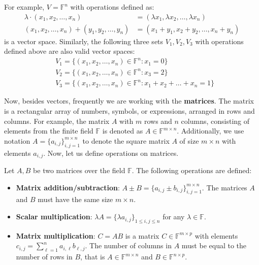 \documentclass[../lecture-notes.tex]{subfiles}
\begin{document}
\begin{example}
    For example, $V = \mathbb{F}^n$ with operations defined as:
    \begin{equation*}
        \begin{aligned}
            \lambda \cdot (x_1,x_2,\dots,x_n) &= (\lambda x_1, \lambda x_2, \dots, \lambda x_n) \\
            (x_1,x_2,\dots,x_n) + (y_1,y_2,\dots,y_n) &= (x_1+y_1, x_2+y_2, \dots, x_n+y_n)
        \end{aligned}
    \end{equation*}
    is a vector space. Similarly, the following three sets $V_1,V_2,V_3$ with operations defined above are also valid vector spaces:
    \begin{equation*}
        \begin{aligned}
            &V_1 = \{(x_1,x_2,\dots,x_n) \in \mathbb{F}^n: x_1 = 0\} \\
            &V_2 = \{(x_1,x_2,\dots,x_n) \in \mathbb{F}^n: x_3 = 2\} \\
            &V_3 = \{(x_1,x_2,\dots,x_n) \in \mathbb{F}^n: x_1+x_2+\dots+x_n = 1\}
        \end{aligned}
    \end{equation*}
\end{example}

Now, besides vectors, frequently we are working with the \textbf{matrices}. The matrix is a rectangular array of numbers, symbols, or expressions, arranged in rows and columns. For example, the matrix $A$ with $m$ rows and $n$ columns, consisting of elements from the finite field $\mathbb{F}$ is denoted as $A \in \mathbb{F}^{m \times n}$. Additionally, we use notation $A = \{a_{i,j}\}_{i,j=1}^{m \times n}$ to denote the square matrix $A$ of size $m \times n$ with elements $a_{i,j}$. Now, let us define operations on matrices.

\begin{definition}
    Let $A,B$ be two matrices over the field $\mathbb{F}$. The following operations are defined:
    \begin{itemize}
        \item \textbf{Matrix addition/subtraction}: $A \pm B = \{a_{i,j} \pm b_{i,j}\}_{i,j=1}^{m \times n}$. The matrices $A$ and $B$ must have the same size $m \times n$.
        \item \textbf{Scalar multiplication}: $\lambda A = \{\lambda a_{i,j}\}_{1\leq i,j \leq n}$ for any $\lambda \in \mathbb{F}$.
        \item \textbf{Matrix multiplication}: $C = AB$ is a matrix $C \in \mathbb{F}^{m \times p}$ with elements $c_{i,j} = \sum_{\ell=1}^{n} a_{i,\ell}b_{\ell,j}$. The number of columns in $A$ must be equal to the number of rows in $B$, that is $A \in \mathbb{F}^{m \times n}$ and $B \in \mathbb{F}^{n \times p}$.
    \end{itemize}
\end{definition}
\end{document}
